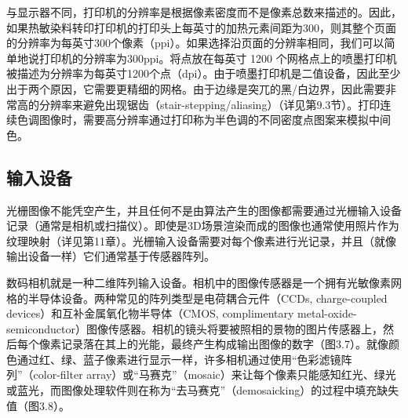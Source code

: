 \documentclass[lang=cn,12pt,marginpar=margintrue]{elegantbook}
\begin{document}

与显示器不同，打印机的分辨率是根据像素密度而不是像素总数来描述的。因此，如果热敏染料转印打印机的打印头上每英寸的加热元素间距为300，则其整个页面的分辨率为每英寸300个像素（ppi）。如果选择沿页面的分辨率相同，我们可以简单地说打印机的分辨率为300ppi。将点放在每英寸 1200 个网格点上的喷墨打印机被描述为分辨率为每英寸1200个点（dpi）。由于喷墨打印机是二值设备，因此至少出于两个原因，它需要更精细的网格。由于边缘是突兀的黑/白边界，因此需要非常高的分辨率来避免出现锯齿（stair-stepping/aliasing）（详见第9.3节）。打印连续色调图像时，需要高分辨率通过打印称为半色调的不同密度点图案来模拟中间色。

\subsection{输入设备}


光栅图像不能凭空产生，并且任何不是由算法产生的图像都需要通过光栅输入设备记录（通常是相机或扫描仪）。即使是3D场景渲染而成的图像也通常使用照片作为纹理映射（详见第11章）。光栅输入设备需要对每个像素进行光记录，并且（就像输出设备一样）它们通常基于传感器阵列。


数码相机就是一种二维阵列输入设备。相机中的图像传感器是一个拥有光敏像素网格的半导体设备。两种常见的阵列类型是电荷耦合元件（CCDs, charge-coupled devices）和互补金属氧化物半导体（CMOS, complimentary metal-oxide-semiconductor）图像传感器。相机的镜头将要被照相的景物的图片传感器上，然后每个像素记录落在其上的光能，最终产生构成输出图像的数字（图3.7）。就像颜色通过红、绿、蓝子像素进行显示一样，许多相机通过使用“色彩滤镜阵列”（color-filter array）或“马赛克”（mosaic）来让每个像素只能感知红光、绿光或蓝光，而图像处理软件则在称为“去马赛克”（demosaicking）的过程中填充缺失值（图3.8）。
\end{document}
